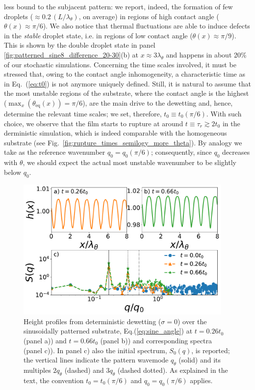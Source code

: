 less bound to the subjacent pattern: we report, indeed,
the formation of few droplets ($\approx 0.2 \, (L/\lambda_{\theta})$, on average) in regions of high contact angle ($\theta(x) \approx \pi/6$).
We also notice that thermal fluctuations are able to induce defects in the \textit{stable} droplet state, i.e. in regions of low contact angle ($\theta(x) \approx \pi/9$). 
This is shown by the double droplet state in panel \ref{fig:patterned_sine8_difference_20-30}(b) at $x \approx 3 \lambda_{\theta}$ and happens in about 20\% of our stochastic simulations.
Concerning the time scales involved, it must be stressed that, owing to the contact angle inhomogeneity, a characteristic time as  
in Eq.~(\ref{eq:t0}) is not anymore uniquely defined. Still, it is natural to assume that the most unstable regions of the substrate, where the contact angle is the highest ($\max_x(\theta_{\text{eq}}(x)) = \pi/6$), are the main drive to the dewetting and, hence, determine the relevant time scales; we set, therefore, $t_0 \equiv t_0(\pi/6)$. With such choice, we observe that the film starts to rupture at around 
$t \equiv \tau_r \gtrsim 2 t_0$ in the derministic simulation, which is indeed comparable with the homogeneous substrate 
(see Fig.~\ref{fig:rupture_times_semilogy_more_theta}). By analogy we take as the reference wavenumber $q_0 = q_0(\pi/6)$; consequently, since 
$q_0$ decreases with $\theta$, we should expect the actual most unstable wavenumber to be slightly below $q_0$.
\begin{figure}
    \centering
    \includegraphics[width=0.95\textwidth]{graphics/psd_spacedepCA_sine_25_10_00_[0, 450000, 1150000]_9_3_rescaled.pdf}
    \caption{Height profiles from deterministic dewetting ($\sigma=0$) 
    over the sinusoidally patterned substrate, Eq.(\ref{eq:sine_angle}) at $t=0.26 t_0$ (panel a)) and $t=0.66 t_0$ (panel b))  
    and corresponding spectra (panel c)).  
    In panel c) also the initial spectrum, $S_0(q)$, is reported; the vertical lines indicate the pattern wavemode $q_{\theta}$ (solid) and its multiples $2q_{\theta}$ (dashed) and $3q_{\theta}$ (dashed dotted).
    As explained in the text, the convention $t_0 = t_0(\pi/6)$ and $q_0 = q_0(\pi/6)$ applies.}   
    \label{fig:spectral_analysis_deter_sine8}
\end{figure}
